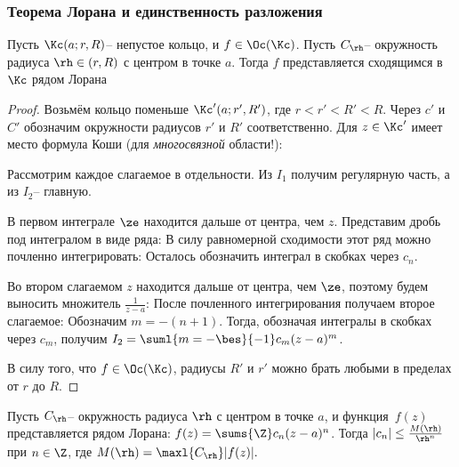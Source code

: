 \documentclass[a4paper]{article}
\begin{document}
\subsubsection{Теорема Лорана и единственность разложения}

\begin{theorem}[Лорана]
Пусть $\Kc(a;r,R)$-- непустое кольцо, и $f \in \Oc(\Kc)$. Пусть $C_\rh$-- окружность радиуса $\rh \in (r, R)$ с
центром в точке $a$. Тогда $f$ представляется сходящимся в $\Kc$ рядом Лорана
\end{theorem}
\begin{proof}
Возьмём кольцо поменьше $\Kc'(a;r',R')$, где $r < r' < R' < R$. Через $c'$ и $C'$ обозначим окружности
радиусов $r'$ и $R'$ соответственно. Для $z\in \Kc'$ имеет место формула Коши
(для \emph{многосвязной} области!):

Рассмотрим каждое слагаемое в отдельности. Из $I_1$ получим регулярную часть, а из $I_2$-- главную.

 В первом интеграле $\ze$ находится дальше от центра, чем $z$. Представим дробь под интегралом в виде ряда:
В силу равномерной сходимости этот ряд можно почленно интегрировать:
Осталось обозначить интеграл в скобках через $c_n$.

 Во втором слагаемом $z$ находится дальше от центра, чем $\ze$, поэтому будем выносить множитель $\frac{1}{z-a}$:
После почленного интегрирования получаем второе слагаемое:
Обозначим $m = -(n+1)$. Тогда, обозначая интегралы в скобках через $c_m$, получим $I_2 = \suml{m=-\bes}{-1} c_m (z-a)^m$.

В силу того, что $f \in \Oc(\Kc)$, радиусы $R'$ и $r'$ можно брать любыми в пределах от $r$ до $R$.
\end{proof}
\begin{imp}
Пусть $C_\rh$-- окружность радиуса $\rh$ с центром в точке $a$, и функция~$f(z)$ представляется рядом
Лорана: $f(z) = \sums{\Z}c_n(z-a)^n$. Тогда $|c_n| \le \frac{M(\rh)}{\rh^n}$ при $n \in \Z$,
где $M(\rh)=\maxl{C_\rh}|f(z)|.$
\end{imp}
\end{document}
